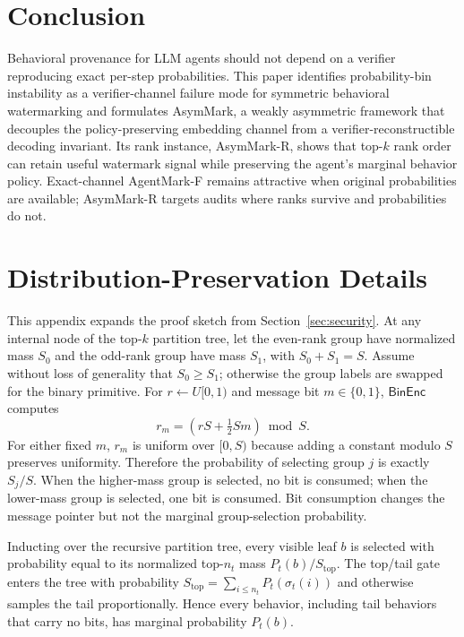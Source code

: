 \documentclass[conference,compsoc]{IEEEtran}
\newcommand{\framework}{AsymMark}
\newcommand{\ours}{AsymMark-R}
\newcommand{\agentmark}{AgentMark-F}
\newcommand{\BinEnc}{\ensuremath{\mathsf{BinEnc}}}
\begin{document}
\section{Conclusion}
\label{sec:conclusion}

Behavioral provenance for LLM agents should not depend on a verifier reproducing exact per-step probabilities. This paper identifies probability-bin instability as a verifier-channel failure mode for symmetric behavioral watermarking and formulates \framework{}, a weakly asymmetric framework that decouples the policy-preserving embedding channel from a verifier-reconstructible decoding invariant. Its rank instance, \ours{}, shows that top-$k$ rank order can retain useful watermark signal while preserving the agent's marginal behavior policy. Exact-channel \agentmark{} remains attractive when original probabilities are available; \ours{} targets audits where ranks survive and probabilities do not.

\appendices

\section{Distribution-Preservation Details}
\label{app:dist-preservation}

This appendix expands the proof sketch from Section~\ref{sec:security}. At any internal node of the top-$k$ partition tree, let the even-rank group have normalized mass $S_0$ and the odd-rank group have mass $S_1$, with $S_0+S_1=S$. Assume without loss of generality that $S_0\geq S_1$; otherwise the group labels are swapped for the binary primitive. For $r\leftarrow U[0,1)$ and message bit $m\in\{0,1\}$, \BinEnc{} computes
\[
  r_m=(rS+\tfrac{1}{2}Sm)\bmod S.
\]
For either fixed $m$, $r_m$ is uniform over $[0,S)$ because adding a constant modulo $S$ preserves uniformity. Therefore the probability of selecting group $j$ is exactly $S_j/S$. When the higher-mass group is selected, no bit is consumed; when the lower-mass group is selected, one bit is consumed. Bit consumption changes the message pointer but not the marginal group-selection probability.

Inducting over the recursive partition tree, every visible leaf $b$ is selected with probability equal to its normalized top-$n_t$ mass $P_t(b)/S_{\mathrm{top}}$. The top/tail gate enters the tree with probability $S_{\mathrm{top}}=\sum_{i\leq n_t}P_t(\sigma_t(i))$ and otherwise samples the tail proportionally. Hence every behavior, including tail behaviors that carry no bits, has marginal probability $P_t(b)$.
\end{document}
